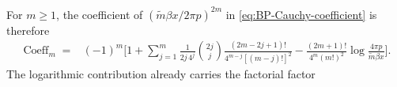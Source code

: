 \documentclass[a4paper,11pt]{article}
\begin{document}
For $m\geq1$, the coefficient of
$(\tilde m\beta x/2\pi p)^{2m}$ in
\eqref{eq:BP-Cauchy-coefficient} is therefore
\begin{align}
	\operatorname{Coeff}_{m}
	={}&
	(-1)^m
	\Bigg[
	1+
	\sum_{j=1}^{m}
	\frac{1}{2j\,4^j}
	\binom{2j}{j}
	\frac{(2m-2j+1)!}
	{4^{m-j}[(m-j)!]^2}
	-\frac{(2m+1)!}{4^m(m!)^2}
	\log\!\frac{4\pi p}{\tilde m\beta x}
	\Bigg].
	\label{eq:BP-m-coefficient-rearranged}
\end{align}
The logarithmic contribution already carries the factorial factor
\end{document}
